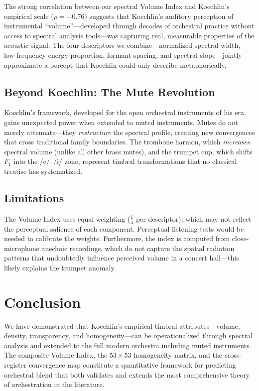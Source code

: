 \documentclass[journal]{IEEEtran}
\begin{document}
The strong correlation between our spectral Volume Index and Koechlin's empirical scale ($\rho = -0.76$) suggests that Koechlin's auditory perception of instrumental ``volume''---developed through decades of orchestral practice without access to spectral analysis tools---was capturing real, measurable properties of the acoustic signal. The four descriptors we combine---normalized spectral width, low-frequency energy proportion, formant spacing, and spectral slope---jointly approximate a percept that Koechlin could only describe metaphorically.

\subsection{Beyond Koechlin: The Mute Revolution}

Koechlin's framework, developed for the open orchestral instruments of his era, gains unexpected power when extended to muted instruments. Mutes do not merely attenuate---they \emph{restructure} the spectral profile, creating new convergences that cross traditional family boundaries. The trombone harmon, which \textit{increases} spectral volume (unlike all other brass mutes), and the trumpet cup, which shifts $F_1$ into the /e/--/i/ zone, represent timbral transformations that no classical treatise has systematized.

\subsection{Limitations}

The Volume Index uses equal weighting ($\frac{1}{4}$ per descriptor), which may not reflect the perceptual salience of each component. Perceptual listening tests would be needed to calibrate the weights. Furthermore, the index is computed from close-microphone anechoic recordings, which do not capture the spatial radiation patterns that undoubtedly influence perceived volume in a concert hall---this likely explains the trumpet anomaly.

\section{Conclusion}
\label{sec:conclusion}

We have demonstrated that Koechlin's empirical timbral attributes---volume, density, transparency, and homogeneity---can be operationalized through spectral analysis and extended to the full modern orchestra including muted instruments. The composite Volume Index, the $53 \times 53$ homogeneity matrix, and the cross-register convergence map constitute a quantitative framework for predicting orchestral blend that both validates and extends the most comprehensive theory of orchestration in the literature.
\end{document}
